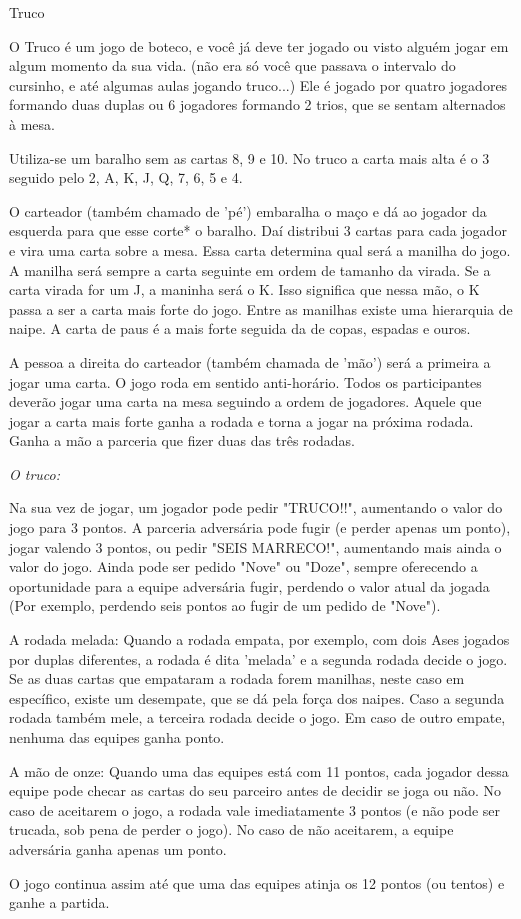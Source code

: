 \begin{subsecao}{Truco}

O Truco é um jogo de boteco, e você já deve ter jogado ou visto alguém jogar em
algum momento da sua vida. (não era só você que passava o intervalo do
cursinho, e até algumas aulas jogando truco...) Ele é jogado por quatro
jogadores formando duas duplas ou 6 jogadores formando 2 trios, que se sentam
alternados à mesa.

Utiliza-se um baralho sem as cartas 8, 9 e 10. No truco a carta mais alta é o 3
seguido pelo 2, A, K, J, Q, 7, 6, 5 e 4. 

O carteador (também chamado de 'pé') embaralha o maço e dá ao jogador da
esquerda para que esse corte* o baralho. Daí distribui 3 cartas para cada
jogador e vira uma carta sobre a mesa. Essa carta determina qual será a manilha
do jogo. A manilha será sempre a carta seguinte em ordem de tamanho da virada.
Se a carta virada for um J, a maninha será o K. Isso significa que nessa mão, o
K passa a ser a carta mais forte do jogo. Entre as manilhas existe uma
hierarquia de naipe. A carta de paus é a mais forte seguida da de copas,
espadas e ouros.

A pessoa a direita do carteador (também chamada de 'mão') será a primeira a
jogar uma carta. O jogo roda em sentido anti-horário. Todos os participantes
deverão jogar uma carta na mesa seguindo a ordem de jogadores. Aquele que jogar
a carta mais forte ganha a rodada e torna a jogar na próxima rodada. Ganha a
mão a parceria que fizer duas das três rodadas.

\textit{O truco:}

Na sua vez de jogar, um jogador pode pedir "TRUCO!!", aumentando o valor do
jogo para 3 pontos. A parceria adversária pode fugir (e perder apenas um
ponto), jogar valendo 3 pontos, ou pedir "SEIS MARRECO!", aumentando mais ainda
o valor do jogo. Ainda pode ser pedido "Nove" ou "Doze", sempre oferecendo a
oportunidade para a equipe adversária fugir, perdendo o valor atual da
jogada (Por exemplo, perdendo seis pontos ao fugir de um pedido de "Nove"). 

A rodada melada: Quando a rodada empata, por exemplo, com dois Ases jogados por
duplas diferentes, a rodada é dita 'melada' e a segunda rodada decide o jogo.
Se as duas cartas que empataram a rodada forem manilhas, neste caso em
específico, existe um desempate, que se dá pela força dos naipes.  Caso a
segunda rodada também mele, a terceira rodada decide o jogo. Em caso de outro
empate, nenhuma das equipes ganha ponto. 

A mão de onze: Quando uma das equipes está com 11 pontos, cada jogador dessa
equipe pode checar as cartas do seu parceiro antes de decidir se joga ou não.
No caso de aceitarem o jogo, a rodada vale imediatamente 3 pontos (e não pode
ser trucada, sob pena de perder o jogo). No caso de não aceitarem, a equipe
adversária ganha apenas um ponto. 

O jogo continua assim até que uma das equipes atinja os 12 pontos (ou tentos) e
ganhe a partida. 

\end{subsecao}
